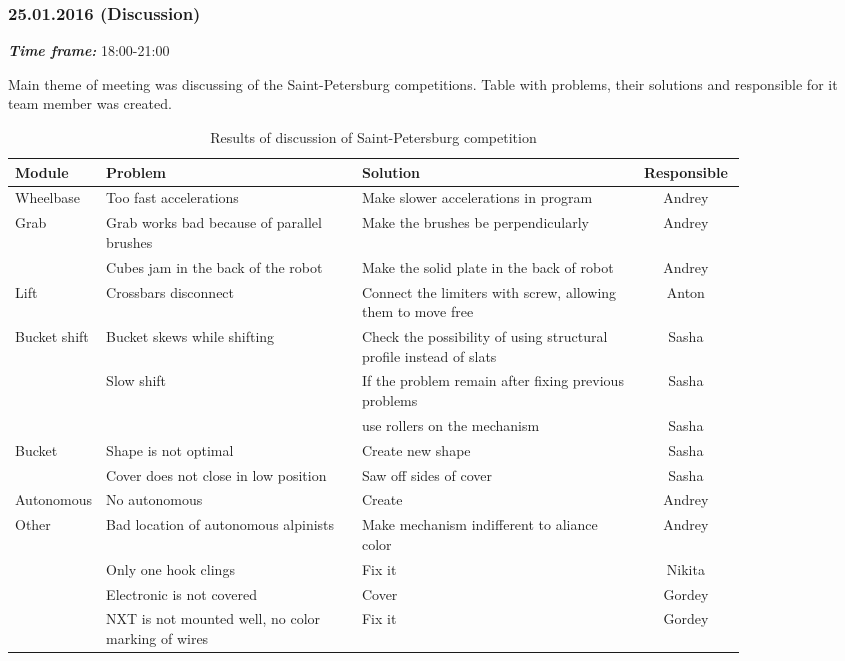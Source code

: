 \subsubsection{25.01.2016 (Discussion)}
\textit{\textbf{Time frame:}} 18:00-21:00 \newline

Main theme of meeting was discussing of the Saint-Petersburg competitions. Table with problems, their solutions and responsible for it team member was created.

\begin{table}[h!]
  \caption{Results of discussion of Saint-Petersburg competition}
  \centering
    \begin{tabular}{|p{0.12\linewidth}|p{0.35\linewidth}|p{0.38\linewidth}|c|}
    	\hline
		Module & Problem & Solution & Responsible \\
		\hline
		Wheelbase & Too fast accelerations & Make slower accelerations in program & \multicolumn{1}{c}{Andrey} \\
		\hline
		Grab  & Grab works bad because of parallel brushes & Make the brushes be perpendicularly & \multicolumn{1}{c}{Andrey} \\
		& Cubes jam in the back of the robot & Make the solid plate in the back of robot & \multicolumn{1}{c}{Andrey} \\
		\hline
		Lift  & Crossbars disconnect & Connect the limiters with screw, allowing them to move free & \multicolumn{1}{c}{Anton} \\
		\hline
		Bucket shift & Bucket skews while shifting & Check the possibility of using structural profile instead of slats & \multicolumn{1}{c}{Sasha} \\
		& Slow shift & If the problem remain after fixing previous problems & \multicolumn{1}{c}{Sasha} \\
		&       & use rollers on the mechanism & \multicolumn{1}{c}{Sasha} \\
		\hline
		Bucket & Shape is not optimal & Create new shape & \multicolumn{1}{c}{Sasha} \\
		& Cover does not close in low position & Saw off sides of cover & \multicolumn{1}{c}{Sasha} \\
		\hline
		Autonomous & No autonomous & Create & \multicolumn{1}{c}{Andrey} \\
		\hline
		Other & Bad location of autonomous alpinists & Make mechanism indifferent to aliance color & \multicolumn{1}{c}{Andrey} \\
		& Only one hook clings & Fix it & \multicolumn{1}{c}{Nikita} \\
		& Electronic is not covered & Cover & \multicolumn{1}{c}{Gordey} \\
		& NXT is not mounted well, no color marking of wires & Fix it & \multicolumn{1}{c}{Gordey} \\
		\hline
    \end{tabular}%
  \label{tabular:meetingSPB25.01}%
\end{table}%